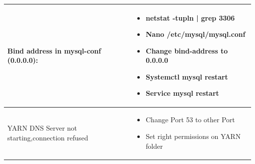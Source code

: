 \begin{table}[H]
\begin{tabular}{|p{4.4cm}|p{12.4cm}|}
Bind address in mysql-conf (0.0.0.0): & \begin{itemize}[noitemsep,leftmargin=*] 
\item netstat -tupln | grep 3306
\item Nano /etc/mysql/mysql.conf
\item Change bind-address to 0.0.0.0
\item Systemctl mysql restart
\item Service mysql restart
\end{itemize}
\\ \hline
YARN DNS Server not starting,\newline connection refused & \begin{itemize}[noitemsep,leftmargin=*] 
\item Change Port 53 to other Port
\item Set right permissions on YARN folder
\end{itemize}
\\ \hline
\end{tabular}
\label{tab:issues}
\end{table}

